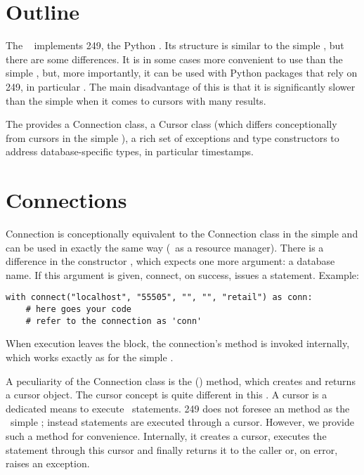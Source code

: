 \section{Outline}
The \nowdb\  implements
 249, the Python .
Its structure is similar to the simple ,
but there are some differences.
It is in some cases more convenient to use
than the simple , but, more importantly,
it can be used with Python packages that rely on
 249, in particular .
The main disadvantage of this  is
that it is significantly slower
than the simple 
when it comes to cursors with many results.

The  provides a Connection class,
a Cursor class (which differs conceptionally
from cursors in the simple ),
a rich set of exceptions and type constructors
to address database-specific types,
in particular timestamps.

\section{Connections}
Connection is conceptionally equivalent
to the Connection class in the simple 
and can be used in exactly the same way (\eg\
as a resource manager).
There is a difference in the constructor
, which expects one more argument:
a database name. If this argument is given,
connect, on success, issues a  statement.
Example:

\begin{python}
\begin{lstlisting}
with connect("localhost", "55505", "", "", "retail") as conn:
    # here goes your code
    # refer to the connection as 'conn'
\end{lstlisting}
\end{python}

When execution leaves the  block,
the connection's  method is invoked internally,
which works exactly as for the simple .

A peculiarity of the Connection class is the () method,
which creates and returns a cursor object.
The cursor concept is quite different in this .
A cursor is a dedicated means to execute \sql\ statements.
 249 does not foresee
an  method as the \nowdb\ simple ;
instead statements are executed through a cursor.
However, we provide such a method for convenience.
Internally, it creates a cursor, executes the statement
through this cursor and finally returns it to the caller
or, on error, raises an exception.

